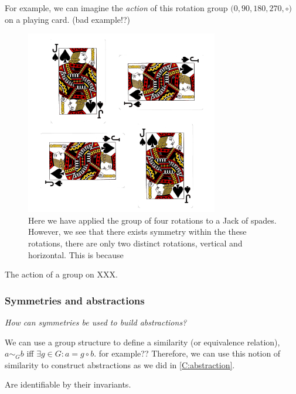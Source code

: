For example, we can imagine the \textit{action} of this rotation group $\big(0, 90, 180, 270, \circ \big)$ on a playing card. (bad example!?)

\begin{figure}[h!]
	\centering
	\includegraphics[width=0.75\textwidth,height=0.5\textheight]{../../pictures/images/jacks.png}
	\caption{Here we have applied the group of four rotations to a Jack of spades.
	However, we see that there exists symmetry within the these rotations,
	there are only two distinct rotations, vertical and horizontal. This is because }
\end{figure}

The action of a group on XXX.

\subsubsection{Symmetries and abstractions}

\begin{displayquote}
\textsl{How can symmetries be used to build abstractions?}
\end{displayquote}

We can use a group structure to define a similarity (or equivalence relation),
$a \sim_G b$ iff $\exists g \in G: a = g \circ b$. {\color{red} for example??} Therefore, we can use this
 notion of similarity to construct abstractions as we did in \ref{C:abstraction}.

Are identifiable by their invariants.


